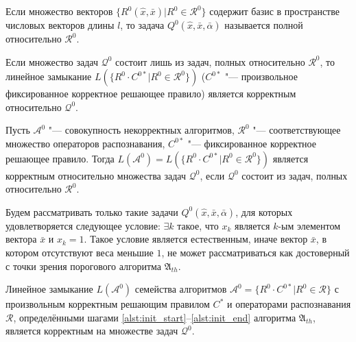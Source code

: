 \begin{Def}
	Если множество векторов $\{R^0(\hat{x},\bar{x})|R^0\in\mathcal R^0\}$ содержит базис в пространстве числовых векторов длины $l$, то задача $Q^0(\hat x,\bar x,\bar\alpha)$ называется полной относительно $\mathcal R^0$.
\end{Def}

\begin{Pred}
	\label{pred:correctness}
	Если множество задач $\mathcal Q^0$ состоит лишь из задач, полных относительно $\mathcal R^0$, то линейное замыкание $L(\{R^0\cdot C^{0*}|R^0\in\mathcal R^0\})$ ($C^{0*}$ "--- произвольное фиксированное корректное решающее правило) является корректным относительно $\mathcal Q^0$.
\end{Pred}

\begin{Corollary}
	Пусть $\mathcal A^0$ "--- совокупность некорректных алгоритмов, $\mathcal R^0$ "--- соответствующее множество операторов распознавания, $C^{0*}$ "--- фиксированное корректное решающее правило. Тогда $L(\mathcal A^0)=L(\{R^0\cdot C^{0*}|R^0\in\mathcal R^0\})$ является корректным относительно множества задач $\mathcal Q^0$, если $\mathcal Q^0$ состоит из задач, полных относительно $\mathcal R^0$.
\end{Corollary}

Будем рассматривать только такие задачи $Q^0(\hat{x},\bar{x},\bar{\alpha})$, для которых удовлетворяется следующее условие: ${\exists}k$ такое, что $x_k$ является $k$-ым элементом вектора $\bar{x}$ и $x_k=1$. Такое условие является естественным, иначе вектор $\bar{x}$, в котором отсутствуют веса меньшие $1$, не может рассматриваться как достоверный с точки зрения порогового алгоритма $\mathfrak A_{th}$.
	
\begin{Theorem}
	\label{th:correctness}
	Линейное замыкание $L(\mathcal A^0)$ семейства алгоритмов $\mathcal A^0=\{R^0\cdot C^{0*}|R^0\in\mathcal R\}$ с произвольным корректным решающим правилом $C^*$ и операторами распознавания $\mathcal R$, определёнными шагами \ref{alst:init_start}--\ref{alst:init_end} алгоритма $\mathfrak A_{th}$, является корректным на множестве задач $\mathcal Q^0$.
\end{Theorem}

